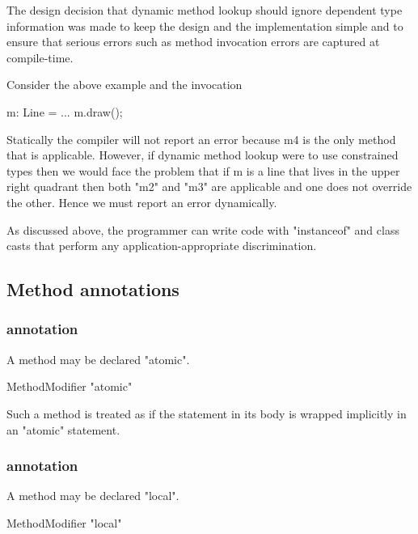 \begin{rationale}
  The design decision that dynamic method lookup should ignore
  dependent type information was made to keep the design and the
  implementation simple and to ensure that serious errors such as
  method invocation errors are captured at compile-time.
 
  Consider the above example and the invocation
\begin{xten}
m: Line = ...
m.draw();    
\end{xten}


   Statically the compiler will not report an error because m4 is the
   only method that is applicable. However, if dynamic method lookup
   were to use constrained types then we would face the problem that if m is a
   line that lives in the upper right quadrant then both \xcd"m2"
   and \xcd"m3"
   are applicable and one does not override the other. Hence we must
   report an error dynamically.

   As discussed above, the programmer can write code with \xcd"instanceof"
   and class casts that perform any application-appropriate
   discrimination.  
\end{rationale}

\subsection{Method annotations}

\subsubsection{ annotation}

A method may be declared \xcd"atomic".

\begin{grammar}
  MethodModifier \: \xcd"atomic"  
\end{grammar}

Such a method is treated as if the statement in its body is wrapped 
implicitly in an \xcd"atomic" statement.

\subsubsection{ annotation}\label{LocalAnnotation}

A method may be declared \xcd"local".

\begin{grammar}
  MethodModifier \: \xcd"local"  
\end{grammar}


